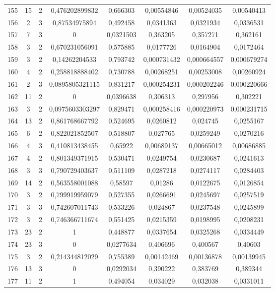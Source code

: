 \begin{longtable}{|c|c|c|c|c|c|c|c|}
155 & 15 & 2 & 0,476202899832 & 0,666303 & 0,00554846 & 0,00524035 & 0,00540413  \\
156 & 2 & 3 & 0,87534975894 & 0,492458 & 0,0341363 & 0,0321934 & 0,0336531  \\
157 & 7 & 3 & 0 & 0,0321503 & 0,363205 & 0,357271 & 0,362161  \\
158 & 3 & 2 & 0,670231056091 & 0,575885 & 0,0177726 & 0,0164904 & 0,0172464  \\
159 & 3 & 2 & 0,14262204533 & 0,793742 & 0,000731432 & 0,000664557 & 0,000679274  \\
160 & 4 & 2 & 0,258818888402 & 0,730788 & 0,00268251 & 0,00253008 & 0,00260924  \\
161 & 2 & 3 & 0,0895805321115 & 0,831217 & 0,000254231 & 0,000202246 & 0,000220666  \\
162 & 11 & 2 & 0 & 0,0396638 & 0,306313 & 0,297956 & 0,302221  \\
163 & 3 & 2 & 0,0975603303297 & 0,829471 & 0,000258416 & 0,000220973 & 0,000231715  \\
164 & 13 & 2 & 0,861768667792 & 0,524695 & 0,0260812 & 0,024745 & 0,0255167  \\
165 & 6 & 2 & 0,822021852507 & 0,518807 & 0,027765 & 0,0259249 & 0,0270216  \\
166 & 4 & 3 & 0,410813438455 & 0,65922 & 0,00689137 & 0,00665012 & 0,00686885  \\
167 & 4 & 2 & 0,801349371915 & 0,530471 & 0,0249754 & 0,0230687 & 0,0241613  \\
168 & 3 & 3 & 0,790729403637 & 0,511109 & 0,0287218 & 0,0274117 & 0,0284403  \\
169 & 14 & 2 & 0,563558001088 & 0,58597 & 0,01286 & 0,0122675 & 0,0126854  \\
170 & 3 & 2 & 0,799919959079 & 0,527355 & 0,0266691 & 0,0245697 & 0,0257519  \\
171 & 3 & 3 & 0,742607011743 & 0,533226 & 0,024867 & 0,0237548 & 0,0245899  \\
172 & 3 & 2 & 0,746366711674 & 0,551425 & 0,0215359 & 0,0198995 & 0,0208231  \\
173 & 23 & 2 & 1 & 0,448877 & 0,0337654 & 0,0325268 & 0,0334449  \\
174 & 23 & 3 & 0 & 0,0277634 & 0,406696 & 0,400567 & 0,40603  \\
175 & 3 & 2 & 0,214344812029 & 0,755389 & 0,00142469 & 0,00136878 & 0,00139945  \\
176 & 13 & 3 & 0 & 0,0292034 & 0,390222 & 0,383769 & 0,389344  \\
177 & 11 & 2 & 1 & 0,494054 & 0,034029 & 0,032038 & 0,0331011  \\

\end{longtable}
